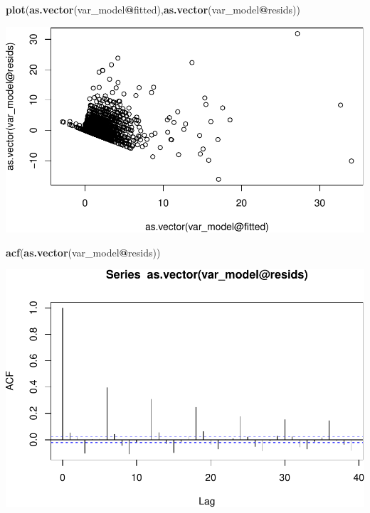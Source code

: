 \documentclass[]{article}
\newenvironment{Shaded}{\begin{snugshade}}{\end{snugshade}}
\newcommand{\KeywordTok}[1]{\textcolor[rgb]{0.13,0.29,0.53}{\textbf{#1}}}
\newcommand{\NormalTok}[1]{#1}
\newcommand{\OperatorTok}[1]{\textcolor[rgb]{0.81,0.36,0.00}{\textbf{#1}}}
\begin{document}
\begin{Shaded}
\begin{Highlighting}[]
\KeywordTok{plot}\NormalTok{(}\KeywordTok{as.vector}\NormalTok{(var_model}\OperatorTok{@}\NormalTok{fitted),}\KeywordTok{as.vector}\NormalTok{(var_model}\OperatorTok{@}\NormalTok{resids))}
\end{Highlighting}
\end{Shaded}

\includegraphics{VAR_files/figure-latex/unnamed-chunk-9-1.pdf}

\begin{Shaded}
\begin{Highlighting}[]
\KeywordTok{acf}\NormalTok{(}\KeywordTok{as.vector}\NormalTok{(var_model}\OperatorTok{@}\NormalTok{resids))}
\end{Highlighting}
\end{Shaded}

\includegraphics{VAR_files/figure-latex/unnamed-chunk-10-1.pdf}
\end{document}
